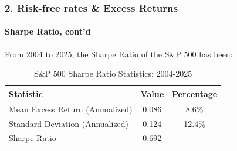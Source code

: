 \documentclass{beamer}
\begin{document}
  \begin{frame}[t]
  \frametitle{2. Risk-free rates \& Excess Returns}
  \framesubtitle{Sharpe Ratio, cont'd}

  From 2004 to 2025, the Sharpe Ratio of the S\&P 500 has been:

  \begin{table}
        \caption{S\&P 500 Sharpe Ratio Statistics: 2004-2025}
      \begin{tabular}{lcc}
      \toprule
      Statistic & Value & Percentage \\
      \midrule
      Mean Excess Return (Annualized) & 0.086 & 8.6\% \\
      Standard Deviation (Annualized) & 0.124 & 12.4\% \\
      Sharpe Ratio & 0.692 & -- \\
      \bottomrule
      \end{tabular}
  \end{table}

\end{frame}
\end{document}

